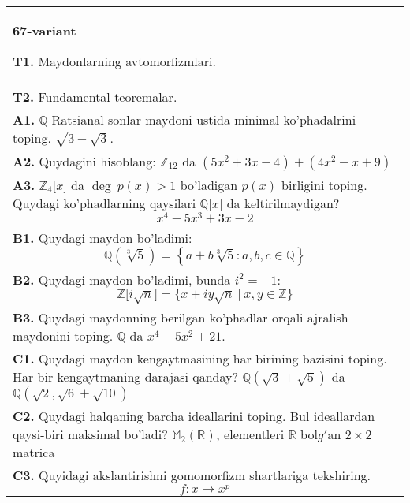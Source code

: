 \documentclass{article}
\begin{document}
\begin{tabular}{m{17cm}}
\textbf{67-variant}
\newline

\textbf{T1.} Maydonlarning avtomorfizmlari. \\
\textbf{T2.} Fundamental teoremalar. \\
\textbf{A1.} \(\mathbb{Q}\) Ratsianal sonlar maydoni ustida minimal ko'phadalrini toping.
\(\sqrt{3 - \sqrt{3}}\). \\
\textbf{A2.} Quydagini hisoblang:
\(\mathbb{Z}_{12}\) da \(\left( 5x^{2} + 3x - 4 \right) + \left( 4x^{2} - x + 9 \right)\) \\
\textbf{A3.} \(\mathbb{Z}_{4}\lbrack x\rbrack\) da \(\deg\ p(x) > 1\) bo'ladigan \(p(x)\) birligini toping. Quydagi ko'phadlarning qaysilari \(\mathbb{Q\lbrack}x\rbrack\) da keltirilmaydigan?
\[x^{4} - 5x^{3} + 3x - 2\] \\
\textbf{B1.} Quydagi maydon bo'ladimi:
\[\mathbb{Q}\left( \sqrt[3]{5} \right) = \left\{ a + b\sqrt[3]{5}:a,b,c \in \mathbb{Q} \right\}\] \\
\textbf{B2.} Quydagi maydon bo'ladimi, bunda \(i^{2} = - 1\):
\[\mathbb{Z\lbrack}i\sqrt{n}\rbrack = \{ x + iy\sqrt{n}\ |\ x,y \in \mathbb{Z\}}\] \\
\textbf{B3.} Quydagi maydonning berilgan ko'phadlar orqali ajralish maydonini toping.
\(\mathbb{Q}\) da \(x^{4} - 5x^{2} + 21\). \\
\textbf{C1.} Quydagi maydon kengaytmasining har birining bazisini toping. Har bir kengaytmaning darajasi qanday?
\(\mathbb{Q}\left( \sqrt{3} + \sqrt{5} \right)\) da \(\mathbb{Q}\left( \sqrt{2},\sqrt{6} + \sqrt{10} \right)\) \\
\textbf{C2.} Quydagi halqaning barcha ideallarini toping. Bul ideallardan qaysi-biri maksimal bo'ladi?
\(\mathbb{M}_{2}\left( \mathbb{R} \right)\), elementleri \(\mathbb{R}\) bol\(g'\)an \(2 \times 2\) matrica \\
\textbf{C3.} Quyidagi akslantirishni gomomorfizm shartlariga tekshiring.
\[f:x \rightarrow x^{p}\] \\

\end{tabular}
\vspace{1cm}
\end{document}
